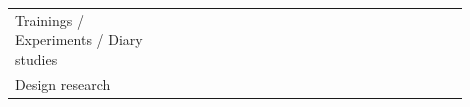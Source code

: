 \documentclass[english, 12pt, a4paper, sci, utf8, a-1b, online]{aaltothesis}
\begin{document}
\begin{center}
\begin{longtable}{p{0.3\linewidth}p{0.6\linewidth}}
    Trainings / Experiments / Diary studies      & \textcite{nebeling2013informing} \newline \textcite{fontao2018mobile} \newline \textcite{dong2019impact} \newline \textcite{miranda2018improving} \newline \textcite{fontao2016mseco} \newline \textcite{ivo2018approach} \newline \textcite{de2017towards} \newline \textcite{nazariodetecting} \newline \textcite{zhang2018toward} \newline \textcite{silva-comparing}                                                                                                                                                                                                                                                                                                                                                                                                                                                                                                                                                                           \\
    Design research                              & \textcite{henriques2018improving} \newline \textcite{pinter2019polymorph} \newline \textcite{dong2019impact} \newline \textcite{oran2017set}                                                                                                                                                                                                                                                                                                                                                                                                                                                                                                                                                                                                                                                                                                                                                                                                       \\

\end{longtable}
\end{center}
\end{document}
